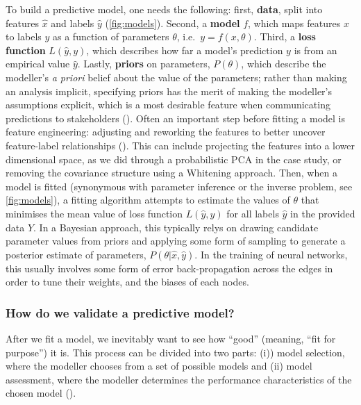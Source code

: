 \begin{refsection}
To build a predictive model, one needs the following: first,
\textbf{data}, split into features \(\hat{x}\) and labels \(\hat{y}\)
(\autoref{fig:models}). Second, a \textbf{model} \(f\), which maps features \(x\)
to labels \(y\) as a function of parameters \(\theta\),
i.e.~\(y = f(x, \theta)\). Third, a \textbf{loss function}
\(L(\hat{y}, y)\), which describes how far a model's prediction \(y\) is
from an empirical value \(\hat{y}\). Lastly, \textbf{priors} on
parameters, \(P(\theta)\), which describe the modeller's \emph{a priori}
belief about the value of the parameters; rather than making an analysis
implicit, specifying priors has the merit of making the modeller's
assumptions explicit, which is a most desirable feature when
communicating predictions to stakeholders
(\cite{Spiegelhalter2000BayMet}). Often an important step before fitting a
model is feature engineering: adjusting and reworking the features to
better uncover feature-label relationships (\cite{Kuhn2019FeaEng}). This
can include projecting the features into a lower dimensional space, as
we did through a probabilistic PCA in the case study, or removing the
covariance structure using a Whitening approach. Then, when a model is
fitted (synonymous with parameter inference or the inverse problem, see
\autoref{fig:models}), a fitting algorithm attempts to estimate the values of
\(\theta\) that minimises the mean value of loss function
\(L(\hat{y},y)\) for all labels \(\hat{y}\) in the provided data \(Y\).
In a Bayesian approach, this typically relys on drawing candidate
parameter values from priors and applying some form of sampling to
generate a posterior estimate of parameters,
\(P(\theta | \hat{x}, \hat{y})\). In the training of neural networks,
this usually involves some form of error back-propagation across the
edges in order to tune their weights, and the biases of each nodes.

\subsubsection{How do we validate a predictive
model?}\label{how-do-we-validate-a-predictive-model}

After we fit a model, we inevitably want to see how ``good'' (meaning,
``fit for purpose'') it is. This process can be divided into two parts:
(i)) model selection, where the modeller chooses from a set of possible
models and (ii) model assessment, where the modeller determines the
performance characteristics of the chosen model (\cite{Hastie2009EleSta}).


\end{refsection}
